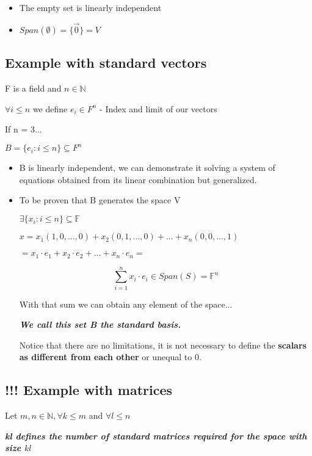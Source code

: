 \documentclass{article}
\begin{document}
\begin{itemize}
    \item The empty set is linearly independent 
    \item \(Span(\emptyset) = \{\vec{0}\} = V\)
\end{itemize}

\subsection*{Example with standard vectors}

F is a field and \(n \in \mathbb{N}\)

\(\forall i \leq n\) we define \(e_i \in F^n\) - Index and limit of our vectors

If n = 3...

\(B = \{e_i : i \leq n\} \subseteq F^n\)

\begin{itemize}
    \item B is linearly independent, we can demonstrate it solving a system of equations obtained from its linear combination but generalized.
    \item To be proven that B generates the space V

    \(\exists \{x_i : i \leq n\} \subseteq \mathbb{F}\) 

    \(x = x_1 (1,0,...,0) + x_2 (0,1,...,0) + ... + x_n  (0,0,...,1)\)
    
    \(= x_1 \cdot e_1 + x_2 \cdot e_2 + ... + x_n \cdot e_n = \)
    
    \[
    \sum_{i=1}^{n} x_i \cdot e_i \in Span(S) = \mathbb{F}^n
    \]

With that sum we can obtain any element of the space... 

\textbf{\textit{We call this set B the standard basis.}}

Notice that there are no limitations, it is not necessary to define the \textbf{scalars as different from each other} or unequal to 0.
\end{itemize}

\subsection*{!!! Example with matrices}

Let \(m,n \in \mathbb{N}, \forall k \leq m\) and \(\forall l \leq n\) 

\textbf{\textit{kl defines the number of standard matrices required for the space with size \(kl\)}}
\end{document}
